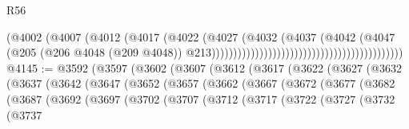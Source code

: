 \begin{lexlean}{R56}
\begin{coremodule}
                                                                      (@4002
                                                                        (@4007
                                                                          (@4012
                                                                            (@4017
                                                                              (@4022
                                                                                (@4027
                                                                                  (@4032
                                                                                    (@4037
                                                                                      (@4042
                                                                                        (@4047
                                                                                          (@205
                                                                                            (@206
                                                                                              @4048
                                                                                              (@209
                                                                                                @4048))
                                                                                            @213))))))))))))))))))))))))))))))))))))))))))))
@4145 := @3592
    (@3597
      (@3602
        (@3607
          (@3612
            (@3617
              (@3622
                (@3627
                  (@3632
                    (@3637
                      (@3642
                        (@3647
                          (@3652
                            (@3657
                              (@3662
                                (@3667
                                  (@3672
                                    (@3677
                                      (@3682
                                        (@3687
                                          (@3692
                                            (@3697
                                              (@3702
                                                (@3707
                                                  (@3712
                                                    (@3717
                                                      (@3722
                                                        (@3727
                                                          (@3732
                                                            (@3737

\end{coremodule}
\end{lexlean}
